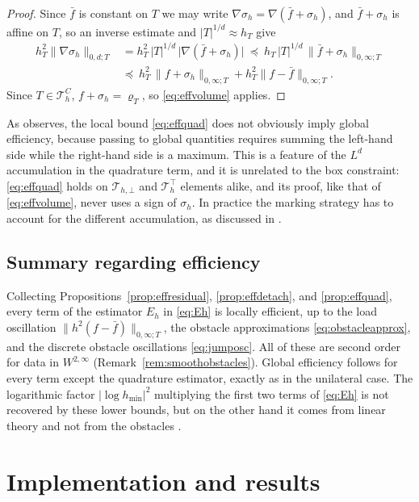 \documentclass[12pt]{amsart}
\numberwithin{equation}{section}
\theoremstyle{plain}
\theoremstyle{definition}
\theoremstyle{remark}
\newcommand{\Th}{\mathcal{T}_h}
\newcommand{\Thbot}{\mathcal{T}_{h,\bot}}
\newcommand{\Thtop}{\Th^\top}
\newcommand{\ThC}{\Th^C}
\begin{document}
\begin{proof}
Since $\bar f$ is constant on $T$ we may write $\nabla\sigma_h = \nabla(\bar f + \sigma_h)$, and $\bar f + \sigma_h$ is affine on $T$, so an inverse estimate and $|T|^{1/d} \approx h_T$ give
\begin{align*}
  h_T^2\|\nabla\sigma_h\|_{0,d;T} &= h_T^2\,|T|^{1/d}\,\bigl|\nabla(\bar f+\sigma_h)\bigr|
  \ \preceq\ h_T\,|T|^{1/d}\,\|\bar f + \sigma_h\|_{0,\infty;T} \\
  &\preceq\ h_T^2\,\|f + \sigma_h\|_{0,\infty;T} + h_T^2\|f - \bar f\|_{0,\infty;T}.
\end{align*}
Since $T \in \ThC$, $f + \sigma_h = \varrho_T$, so \eqref{eq:effvolume} applies.
\end{proof}

As \cite[\S 6.3]{NSV03} observes, the local bound \eqref{eq:effquad} does not obviously imply global efficiency, because passing to global quantities requires summing the left-hand side while the right-hand side is a maximum.  This is a feature of the $L^d$ accumulation in the quadrature term, and it is unrelated to the box constraint: \eqref{eq:effquad} holds on $\Thbot$ and $\Thtop$ elements alike, and its proof, like that of \eqref{eq:effvolume}, never uses a sign of $\sigma_h$.  In practice the marking strategy has to account for the different accumulation, as discussed in \cite[\S 7.1]{NSV03}.

\subsection{Summary regarding efficiency}  Collecting Propositions~\ref{prop:effresidual}, \ref{prop:effdetach}, and \ref{prop:effquad}, every term of the estimator $E_h$ in \eqref{eq:Eh} is locally efficient, up to the load oscillation $\|h^2(f-\bar f)\|_{0,\infty;T}$, the obstacle approximations \eqref{eq:obstacleapprox}, and the discrete obstacle oscillations \eqref{eq:jumposc}.  All of these are second order for data in $W^{2,\infty}$ (Remark~\ref{rem:smoothobstacles}).  Global efficiency follows for every term except the quadrature estimator, exactly as in the unilateral case.  The logarithmic factor $|\log h_{\min}|^2$ multiplying the first two terms of \eqref{eq:Eh} is not recovered by these lower bounds, but on the other hand it comes from linear theory and not from the obstacles \cite[Remark 5.10]{NSV03}.


\section{Implementation and results}
\label{sec:library}
\end{document}
